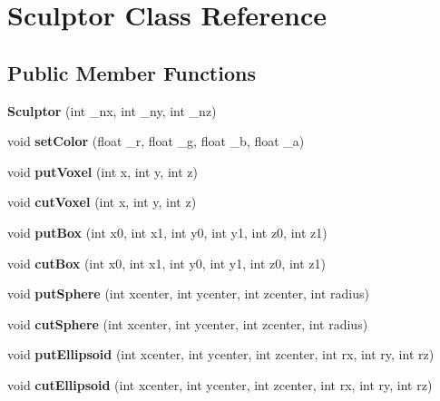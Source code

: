 \hypertarget{classSculptor}{}\section{Sculptor Class Reference}
\label{classSculptor}
\subsection*{Public Member Functions}
\begin{DoxyCompactItemize}
\item 
\mbox{\label{classSculptor_a014e3ef5517bf0e9d9e14486b6ac6433}} 
{\bfseries Sculptor} (int \+\_\+nx, int \+\_\+ny, int \+\_\+nz)
\item 
\mbox{\label{classSculptor_a5723e671e073ac310b6f385a7fdc9f9f}} 
void {\bfseries set\+Color} (float \+\_\+r, float \+\_\+g, float \+\_\+b, float \+\_\+a)
\item 
\mbox{\label{classSculptor_a4bdea3048b419d58e93074060eaa7b52}} 
void {\bfseries put\+Voxel} (int x, int y, int z)
\item 
\mbox{\label{classSculptor_ad9d714a35fc8ae16d06eb5df37c3493c}} 
void {\bfseries cut\+Voxel} (int x, int y, int z)
\item 
\mbox{\label{classSculptor_a311ad7a0fb83fc67ac1f378be8e99fe1}} 
void {\bfseries put\+Box} (int x0, int x1, int y0, int y1, int z0, int z1)
\item 
\mbox{\label{classSculptor_aa84a1b12b09e9e103fc8d78f8d1bc00f}} 
void {\bfseries cut\+Box} (int x0, int x1, int y0, int y1, int z0, int z1)
\item 
\mbox{\label{classSculptor_a794a2b6ee8fc8098fd6150cb46101fc6}} 
void {\bfseries put\+Sphere} (int xcenter, int ycenter, int zcenter, int radius)
\item 
\mbox{\label{classSculptor_a67ab8c0ba5116adb8af1d01ad373ac15}} 
void {\bfseries cut\+Sphere} (int xcenter, int ycenter, int zcenter, int radius)
\item 
\mbox{\label{classSculptor_a093615b0c2b9b3a17a56300b9b939f39}} 
void {\bfseries put\+Ellipsoid} (int xcenter, int ycenter, int zcenter, int rx, int ry, int rz)
\item 
\mbox{\label{classSculptor_a18d2922c111c4c13653ee07d878151ad}} 
void {\bfseries cut\+Ellipsoid} (int xcenter, int ycenter, int zcenter, int rx, int ry, int rz)
\end{DoxyCompactItemize}
